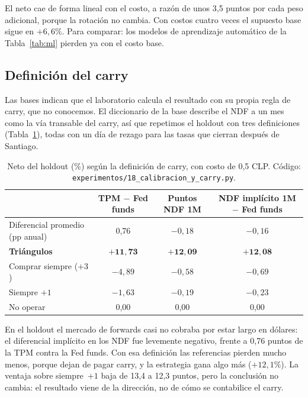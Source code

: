 \documentclass[10pt,a4paper]{article}
\newcommand{\ruta}[1]{\nolinkurl{#1}}
\begin{document}
El neto cae de forma lineal con el costo, a razón de unos 3,5 puntos por cada peso
adicional, porque la rotación no cambia. Con costos cuatro veces el supuesto base sigue
en $+6{,}6\%$. Para comparar: los modelos de aprendizaje automático de la
Tabla~\ref{tab:ml} pierden ya con el costo base.

\subsection{Definición del carry}\label{sec:rob_carry}

Las bases indican que el laboratorio calcula el resultado con su propia regla de carry,
que no conocemos. El diccionario de la base describe el NDF a un mes como la vía
transable del carry, así que repetimos el holdout con tres definiciones
(Tabla~\ref{tab:carry}), todas con un día de rezago para las tasas que cierran después
de Santiago.

\begin{table}[htb]\centering\small
\begin{tabular}{@{}lccc@{}}
\toprule
& TPM $-$ Fed funds & Puntos NDF 1M & NDF implícito 1M $-$ Fed funds \\
\midrule
Diferencial promedio (pp anual) & 0,76 & $-0{,}18$ & $-0{,}16$ \\
\midrule
\textbf{Triángulos}    & $\mathbf{+11{,}73}$ & $\mathbf{+12{,}09}$ & $\mathbf{+12{,}08}$ \\
Comprar siempre ($+3$) & $-4{,}89$ & $-0{,}58$ & $-0{,}69$ \\
Siempre $+1$           & $-1{,}63$ & $-0{,}19$ & $-0{,}23$ \\
No operar              & 0,00 & 0,00 & 0,00 \\
\bottomrule
\end{tabular}
\caption{Neto del holdout (\%) según la definición de carry, con costo de 0,5 CLP.
Código: \ruta{experimentos/18_calibracion_y_carry.py}.}\label{tab:carry}
\end{table}

En el holdout el mercado de forwards casi no cobraba por estar largo en dólares: el
diferencial implícito en los NDF fue levemente negativo, frente a 0,76 puntos de la TPM
contra la Fed funds. Con esa definición las referencias pierden mucho menos, porque
dejan de pagar carry, y la estrategia gana algo más ($+12{,}1\%$). La ventaja sobre
siempre~$+1$ baja de 13,4 a 12,3 puntos, pero la conclusión no cambia: el resultado
viene de la dirección, no de cómo se contabilice el carry.
\end{document}
